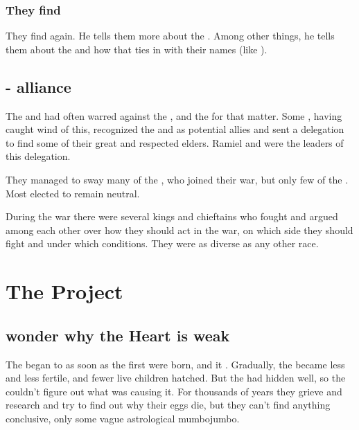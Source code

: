 \subsubsection{They find \Semiza}
They find \Semiza{} again. 
He tells them more about the \banes. 
Among other things, he tells them about the  and how that ties in with their names (like ). 









\subsection{\Resphan-\aryoth{} alliance}
The \aryothim{} and \vorcanths{} had often warred against the \dragons, and the \quiljaaran{} for that matter. 
Some \resphain{}, having caught wind of this, recognized the \aryothim{} and \vorcanths{} as potential allies and sent a delegation to find some of their great and respected elders. 
Ramiel and \Shiaraid{} were the leaders of this delegation. 

They managed to sway many of the \aryothim{}, who joined their war, but only few of the \vorcanths{}. 
Most \vorcanths{} elected to remain neutral. 

During the war there were several \aryoth{} kings and chieftains who fought and argued among each other over how they should act in the war, on which side they should fight and under which conditions. 
They were as diverse as any other race. 















\section{The \Sathariah{} Project}









\subsection{\Dragons{} wonder why the Heart is weak}
The  began to  as soon as the first \resphain{} were born, and it . 
Gradually, the \dragons{} became less and less fertile, and fewer live children hatched. 
But the \banelords{} had hidden  well, so the \dragons{} couldn't figure out what was causing it. 
For thousands of years they grieve and research and try to find out why their eggs die, but they can't find anything conclusive, only some vague astrological  mumbojumbo. 

